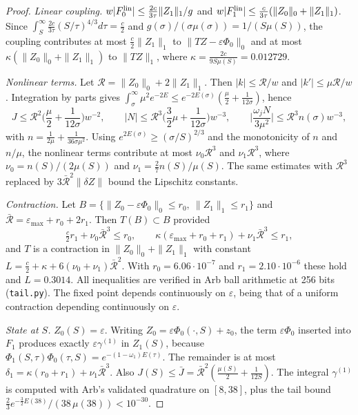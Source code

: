 \documentclass[11pt]{amsart}
\theoremstyle{remark}
\newcommand{\eps}{\varepsilon}
\begin{document}
\begin{proof}
\emph{Linear coupling.} $w|F_0^{\rm lin}|\le\frac{2c}{3\tau}\|Z_1\|_1/g$ and $w|F_1^{\rm lin}|\le\frac{c}{3\tau}(\|Z_0\|_0+\|Z_1\|_1)$. Since $\int_S^\infty\frac{2c}{3\tau}(S/\tau)^{4/3}d\tau=\frac c2$ and $g(\sigma)/(\sigma\mu(\sigma))=1/(S\mu(S))$, the coupling contributes at most $\frac c2\|Z_1\|_1$ to $\|TZ-\eps\Phi_0\|_0$ and at most $\kappa(\|Z_0\|_0+\|Z_1\|_1)$ to $\|TZ\|_1$, where $\kappa=\frac{2c}{9S\mu(S)}=0.012729$.

\emph{Nonlinear terms.} Let $\mathcal R=\|Z_0\|_0+2\|Z_1\|_1$. Then $|k|\le\mathcal R/w$ and $|k'|\le\mu\mathcal R/w$. Integration by parts gives $\int_\sigma^\infty\mu^2e^{-2E}\le e^{-2E(\sigma)}(\frac\mu2+\frac1{12\sigma})$, hence
\[
J\le\mathcal R^2\Big(\frac\mu2+\frac1{12\sigma}\Big)w^{-2},\qquad |N|\le\mathcal R^3\Big(\frac32\mu+\frac1{12\sigma}\Big)w^{-3},\qquad
\Big|\frac{\omega_jN}{3\mu^2}\Big|\le \mathcal R^3n(\sigma)w^{-3},
\]
with $n=\frac1{2\mu}+\frac1{36\sigma\mu^2}$. Using $e^{2E(\sigma)}\ge(\sigma/S)^{2/3}$ and the monotonicity of $n$ and $n/\mu$, the nonlinear terms contribute at most $\nu_0\mathcal R^3$ and $\nu_1\mathcal R^3$, where $\nu_0=n(S)/(2\mu(S))$ and $\nu_1=\frac27n(S)/\mu(S)$. The same estimates with $\mathcal R^3$ replaced by $3\bar{\mathcal R}^2\|\delta Z\|$ bound the Lipschitz constants.

\emph{Contraction.} Let $B=\{\|Z_0-\eps\Phi_0\|_0\le r_0,\ \|Z_1\|_1\le r_1\}$ and $\bar{\mathcal R}=\eps_{\max}+r_0+2r_1$. Then $T(B)\subset B$ provided
\[
\tfrac c2r_1+\nu_0\bar{\mathcal R}^3\le r_0,\qquad \kappa(\eps_{\max}+r_0+r_1)+\nu_1\bar{\mathcal R}^3\le r_1,
\]
and $T$ is a contraction in $\|Z_0\|_0+\|Z_1\|_1$ with constant $L=\frac c2+\kappa+6(\nu_0+\nu_1)\bar{\mathcal R}^2$. With $r_0=6.06\cdot10^{-7}$ and $r_1=2.10\cdot10^{-6}$ these hold and $L=0.3014$. All inequalities are verified in Arb ball arithmetic at 256 bits (\texttt{tail.py}). The fixed point depends continuously on $\eps$, being that of a uniform contraction depending continuously on $\eps$.

\emph{State at $S$.} $Z_0(S)=\eps$. Writing $Z_0=\eps\Phi_0(\cdot,S)+z_0$, the term $\eps\Phi_0$ inserted into $F_1$ produces exactly $\eps\gamma^{(1)}$ in $Z_1(S)$, because $\Phi_1(S,\tau)\Phi_0(\tau,S)=e^{-(1-\omega_1)E(\tau)}$. The remainder is at most $\delta_1=\kappa(r_0+r_1)+\nu_1\bar{\mathcal R}^3$. Also $J(S)\le\bar J=\bar{\mathcal R}^2(\frac{\mu(S)}2+\frac1{12S})$. The integral $\gamma^{(1)}$ is computed with Arb's validated quadrature on $[8,38]$, plus the tail bound $\frac23e^{-\frac32E(38)}/(38\,\mu(38))<10^{-30}$.
\end{proof}
\end{document}
